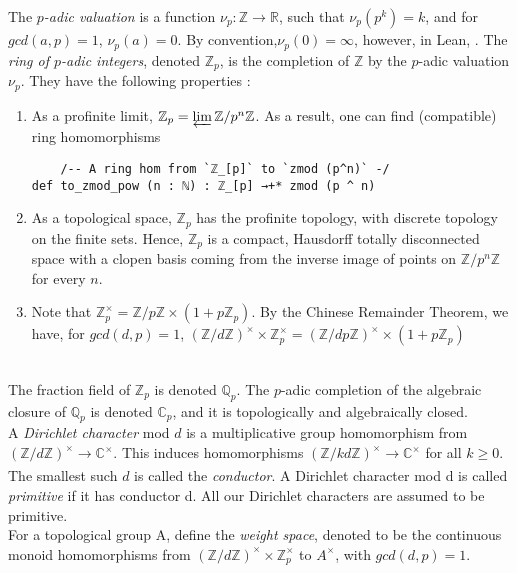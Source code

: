 \documentclass[11pt]{article}
\begin{document}
The \textit{$p$-adic valuation} is a function $\nu_p : \mathbb{Z} \xrightarrow[]{} \mathbb{R}$, such that
$\nu_p (p^k) = k$, and for $gcd(a,p) = 1$, $\nu_p (a) = 0$. By convention,$\nu_p (0) = \infty$, however, in Lean, .
The \textit{ring of $p$-adic integers}, denoted $\mathbb{Z}_p$, is the completion of $\mathbb{Z}$ by the $p$-adic
valuation $\nu_p$. They have the following properties :
\begin{enumerate}
  \item As a profinite limit, $\mathbb{Z}_p = \varprojlim \mathbb{Z} / p^n \mathbb{Z}$. As a result,
  one can find (compatible) ring homomorphisms
  \begin{lstlisting}
    /-- A ring hom from `ℤ_[p]` to `zmod (p^n)` -/
def to_zmod_pow (n : ℕ) : ℤ_[p] →+* zmod (p ^ n)
  \end{lstlisting}
  \item As a topological space, $\mathbb{Z}_p$ has the profinite topology, with discrete topology
  on the finite sets. Hence, $\mathbb{Z}_p$ is a compact, Hausdorff totally disconnected space
  with a clopen basis coming from the inverse image of points on $\mathbb{Z}/p^n \mathbb{Z}$ for
  every $n$.
  \item Note that $\mathbb{Z}_p^{\times} = \mathbb{Z}/p \mathbb{Z} \times (1 + p \mathbb{Z}_p)$.
  By the Chinese Remainder Theorem, we have, for $gcd(d, p) = 1$,
  $(\mathbb{Z}/d\mathbb{Z})^{\times} \times \mathbb{Z}_p^{\times} =
  (\mathbb{Z}/dp \mathbb{Z})^{\times} \times (1 + p \mathbb{Z}_p)$
\end{enumerate} \\

The fraction field of $\mathbb{Z}_p$ is denoted $\mathbb{Q}_p$.
The $p$-adic completion of the algebraic closure of $\mathbb{Q}_p$ is denoted $\mathbb{C}_p$, and it
is topologically and algebraically closed. \\

A \textit{Dirichlet character} mod $d$ is a multiplicative group homomorphism from
$(\mathbb{Z}/d\mathbb{Z})^{\times} \xrightarrow[]{} \mathbb{C}^{\times}$. This induces homomorphisms
$(\mathbb{Z}/kd\mathbb{Z})^{\times} \xrightarrow[]{} \mathbb{C}^{\times}$ for all $k \ge 0$.
The smallest such $d$ is called the \textit{conductor}. A Dirichlet character mod d is called
\textit{primitive} if it has conductor d. All our Dirichlet characters are assumed to be primitive. \\

For a topological group A, define the \textit{weight space}, denoted  to be the
continuous monoid homomorphisms from
$(\mathbb{Z}/d\mathbb{Z})^{\times} \times \mathbb{Z}_p^{\times}$ to $A^{\times}$, with $gcd(d,p) = 1$. \\
\end{document}
